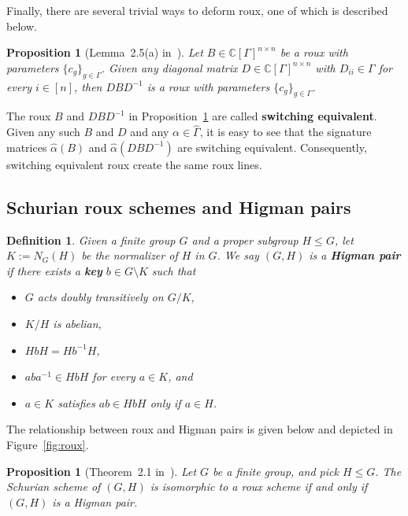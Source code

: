 \documentclass[11pt]{article}
\newtheorem{proposition}[theo]{Proposition}
\newtheorem{definition}[theo]{Definition}
\theoremstyle{definition}
\numberwithin{equation}{section}
\begin{document}
Finally, there are several trivial ways to deform roux, one of which is described below.

\begin{proposition}[Lemma~2.5(a) in~\cite{IversonM:18}]
\label{prop.switching equivalent roux}
Let $B \in \mathbb{C}[\Gamma]^{n\times n}$ be a roux with parameters $\{c_g \}_{g \in \Gamma}$.
Given any diagonal matrix $D \in \mathbb{C}[\Gamma]^{n\times n}$ with $D_{ii} \in \Gamma$ for every $i \in [n]$, then $DBD^{-1}$ is a roux with parameters $\{c_g\}_{g\in \Gamma}$.
\end{proposition}

The roux $B$ and $DBD^{-1}$ in Proposition~\ref{prop.switching equivalent roux} are called \textbf{switching equivalent}.
Given any such $B$ and $D$ and any $\alpha \in \widehat{\Gamma}$, it is easy to see that the signature matrices $\hat{\alpha}(B)$ and $\hat{\alpha}(DBD^{-1})$ are switching equivalent.
Consequently, switching equivalent roux create the same roux lines.

\subsection{Schurian roux schemes and Higman pairs}

\begin{definition}
Given a finite group $G$ and a proper subgroup $H\leq G$, let $K:=N_G(H)$ be the normalizer of $H$ in $G$.
We say $(G,H)$ is a \textbf{Higman pair} if there exists a \textbf{key} $b\in G\setminus K$ such that
\begin{itemize}
\item[(H1)]
$G$ acts doubly transitively on $G/K$,
\item[(H2)]
$K/H$ is abelian,
\item[(H3)]
$HbH=Hb^{-1}H$,
\item[(H4)]
$aba^{-1}\in HbH$ for every $a\in K$, and
\item[(H5)]
$a \in K$ satisfies $ab \in HbH$ only if $a \in H$.
\end{itemize}
\end{definition}

The relationship between roux and Higman pairs is given below and depicted in Figure~\ref{fig:roux}.

\begin{proposition}[Theorem~2.1 in~\cite{IversonM:18}]
\label{prop.schurian roux}
Let $G$ be a finite group, and pick $H\leq G$.
The Schurian scheme of $(G,H)$ is isomorphic to a roux scheme if and only if $(G,H)$ is a Higman pair.
\end{proposition}
\end{document}
